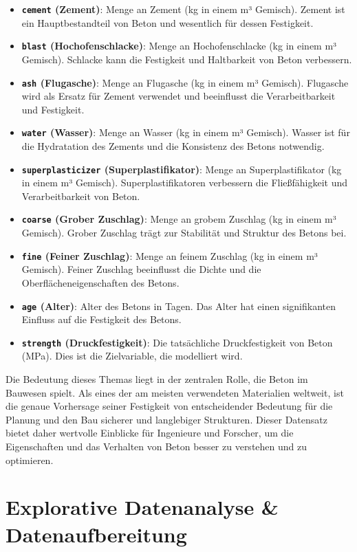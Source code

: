 \begin{itemize}
    \item \textbf{\texttt{cement} (Zement)}: Menge an Zement (kg in einem m³ Gemisch). Zement ist ein Hauptbestandteil von Beton und wesentlich für dessen Festigkeit.
    \item \textbf{\texttt{blast} (Hochofenschlacke)}: Menge an Hochofenschlacke (kg in einem m³ Gemisch). Schlacke kann die Festigkeit und Haltbarkeit von Beton verbessern.
    \item \textbf{\texttt{ash} (Flugasche)}: Menge an Flugasche (kg in einem m³ Gemisch). Flugasche wird als Ersatz für Zement verwendet und beeinflusst die Verarbeitbarkeit und Festigkeit.
    \item \textbf{\texttt{water} (Wasser)}: Menge an Wasser (kg in einem m³ Gemisch). Wasser ist für die Hydratation des Zements und die Konsistenz des Betons notwendig.
    \item \textbf{\texttt{superplasticizer} (Superplastifikator)}: Menge an Superplastifikator (kg in einem m³ Gemisch). Superplastifikatoren verbessern die Fließfähigkeit und Verarbeitbarkeit von Beton.
    \item \textbf{\texttt{coarse} (Grober Zuschlag)}: Menge an grobem Zuschlag (kg in einem m³ Gemisch). Grober Zuschlag trägt zur Stabilität und Struktur des Betons bei.
    \item \textbf{\texttt{fine} (Feiner Zuschlag)}: Menge an feinem Zuschlag (kg in einem m³ Gemisch). Feiner Zuschlag beeinflusst die Dichte und die Oberflächeneigenschaften des Betons.
    \item \textbf{\texttt{age} (Alter)}: Alter des Betons in Tagen. Das Alter hat einen signifikanten Einfluss auf die Festigkeit des Betons.
    \item \textbf{\texttt{strength} (Druckfestigkeit)}: Die tatsächliche Druckfestigkeit von Beton (MPa). Dies ist die Zielvariable, die modelliert wird.
\end{itemize}
 
Die Bedeutung dieses Themas liegt in der zentralen Rolle, die Beton im Bauwesen spielt. 
Als eines der am meisten verwendeten Materialien weltweit, ist die genaue Vorhersage seiner Festigkeit von entscheidender 
Bedeutung für die Planung und den Bau sicherer und langlebiger Strukturen. Dieser Datensatz bietet daher wertvolle Einblicke für Ingenieure und Forscher, 
um die Eigenschaften und das Verhalten von Beton besser zu verstehen und zu optimieren.

\section{Explorative Datenanalyse \& Datenaufbereitung}

